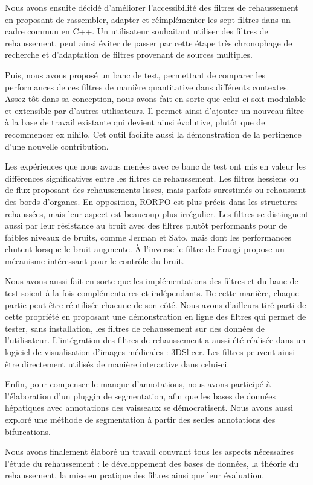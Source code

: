 Nous avons ensuite décidé d'améliorer l'accessibilité des filtres de rehaussement en proposant de rassembler, adapter et réimplémenter les sept filtres dans un cadre commun en C++. Un utilisateur souhaitant utiliser des filtres de rehaussement, peut ainsi éviter de passer par cette étape très chronophage de recherche et d'adaptation de filtres provenant de sources multiples. 

Puis, nous avons proposé un banc de test, permettant de comparer les performances de ces filtres de manière quantitative dans différents contextes. Assez tôt dans sa conception, nous avons fait en sorte que celui-ci soit modulable et extensible par d'autres utilisateurs. Il permet ainsi d'ajouter un nouveau filtre à la base de travail existante qui devient ainsi évolutive, plutôt que de recommencer ex nihilo. Cet outil facilite aussi la démonstration de la pertinence d'une nouvelle contribution.

Les expériences que nous avons menées avec ce banc de test ont mis en valeur les différences significatives entre les filtres de rehaussement. Les filtres hessiens ou de flux proposant des rehaussements lisses, mais parfois surestimés ou rehaussant des bords d'organes. En opposition, RORPO est plus précis dans les structures rehaussées, mais leur aspect est beaucoup plus irrégulier. Les filtres se distinguent aussi par leur résistance au bruit avec des filtres plutôt performants pour de faibles niveaux de bruits, comme Jerman et Sato, mais dont les performances chutent lorsque le bruit augmente. À l'inverse le filtre de Frangi propose un mécanisme intéressant pour le contrôle du bruit.

Nous avons aussi fait en sorte que les implémentations des filtres et du banc de test soient à la fois complémentaires et indépendants. De cette manière, chaque partie peut être réutilisée chacune de son côté. Nous avons d'ailleurs tiré parti de cette propriété en proposant une démonstration en ligne des filtres qui permet de tester, sans installation, les filtres de rehaussement sur des données de l'utilisateur. L'intégration des filtres de rehaussement a aussi été réalisée dans un logiciel de visualisation d'images médicales : 3DSlicer. Les filtres peuvent ainsi être directement utilisés de manière interactive dans celui-ci.

Enfin, pour compenser le manque d'annotations, nous avons participé à l'élaboration d'un pluggin de segmentation, afin que les bases de données hépatiques avec annotations des vaisseaux se démocratisent. Nous avons aussi exploré une méthode de segmentation à partir des seules annotations des bifurcations.

Nous avons finalement élaboré un travail couvrant tous les aspects nécessaires l'étude du rehaussement : le développement des bases de données, la théorie du rehaussement, la mise en pratique des filtres ainsi que leur évaluation.